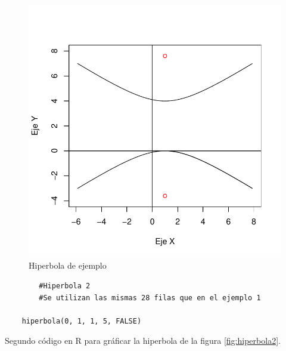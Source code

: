 \documentclass[12pt,a4paper]{article}
\begin{document}
\newpage
\begin{figure}
\centering
\includegraphics[scale=.8]{HIP1}
\caption{Hiperbola de ejemplo}
\label{fig:hiperbola1}
\end{figure}

\begin{table}[htpb]
	\begin{lstlisting}
		#Hiperbola 2		
		#Se utilizan las mismas 28 filas que en el ejemplo 1
		
	hiperbola(0, 1, 1, 5, FALSE)
	\end{lstlisting}
	\caption{Segundo código en R para gráficar la hiperbola de la figura \ref{fig:hiperbola2}.}
	\label{alg:recta2}
\end{table}
\end{document}
